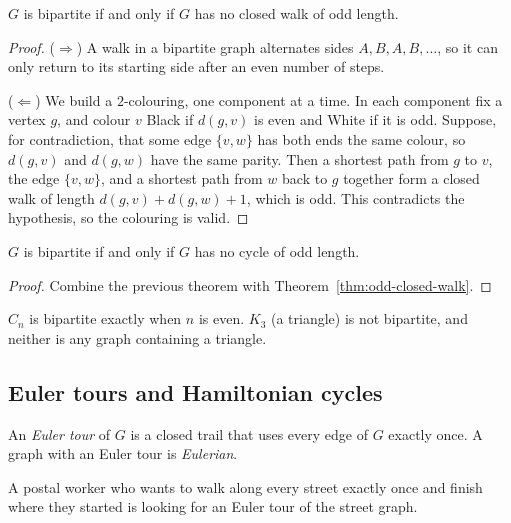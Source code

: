 \bigskip
\begin{theorem}
$G$ is bipartite if and only if $G$ has no closed walk of odd length.
\end{theorem}
\begin{proof}
($\Rightarrow$) A walk in a bipartite graph alternates sides $A,B,A,B,\dots$, so it can only return to its starting side after an even number of steps.

($\Leftarrow$) We build a $2$-colouring, one component at a time. In each component fix a vertex $g$, and colour $v$ Black if $d(g,v)$ is even and White if it is odd. Suppose, for contradiction, that some edge $\{v,w\}$ has both ends the same colour, so $d(g,v)$ and $d(g,w)$ have the same parity. Then a shortest path from $g$ to $v$, the edge $\{v,w\}$, and a shortest path from $w$ back to $g$ together form a closed walk of length $d(g,v)+d(g,w)+1$, which is odd. This contradicts the hypothesis, so the colouring is valid.
\end{proof}

\begin{corollary}
$G$ is bipartite if and only if $G$ has no cycle of odd length.
\end{corollary}
\begin{proof}
Combine the previous theorem with Theorem~\ref{thm:odd-closed-walk}.
\end{proof}

\begin{example}
$C_n$ is bipartite exactly when $n$ is even. $K_3$ (a triangle) is not bipartite, and neither is any graph containing a triangle.
\end{example}

\subsection{Euler tours and Hamiltonian cycles}
\label{sec:11-11}

\begin{definition}
An \emph{Euler tour} of $G$ is a closed trail that uses every edge of $G$ exactly once. A graph with an Euler tour is \emph{Eulerian}.
\end{definition}

\begin{example}
A postal worker who wants to walk along every street exactly once and finish where they started is looking for an Euler tour of the street graph.
\end{example}

